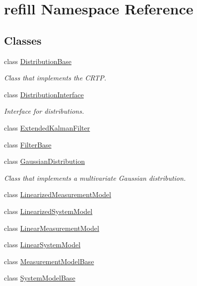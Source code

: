 \hypertarget{namespacerefill}{}\section{refill Namespace Reference}
\label{namespacerefill}
\subsection*{Classes}
\begin{DoxyCompactItemize}
\item 
class \hyperlink{classrefill_1_1DistributionBase}{Distribution\+Base}
\begin{DoxyCompactList}\small\item\em Class that implements the C\+R\+TP. \end{DoxyCompactList}\item 
class \hyperlink{classrefill_1_1DistributionInterface}{Distribution\+Interface}
\begin{DoxyCompactList}\small\item\em Interface for distributions. \end{DoxyCompactList}\item 
class \hyperlink{classrefill_1_1ExtendedKalmanFilter}{Extended\+Kalman\+Filter}
\item 
class \hyperlink{classrefill_1_1FilterBase}{Filter\+Base}
\item 
class \hyperlink{classrefill_1_1GaussianDistribution}{Gaussian\+Distribution}
\begin{DoxyCompactList}\small\item\em Class that implements a multivariate Gaussian distribution. \end{DoxyCompactList}\item 
class \hyperlink{classrefill_1_1LinearizedMeasurementModel}{Linearized\+Measurement\+Model}
\item 
class \hyperlink{classrefill_1_1LinearizedSystemModel}{Linearized\+System\+Model}
\item 
class \hyperlink{classrefill_1_1LinearMeasurementModel}{Linear\+Measurement\+Model}
\item 
class \hyperlink{classrefill_1_1LinearSystemModel}{Linear\+System\+Model}
\item 
class \hyperlink{classrefill_1_1MeasurementModelBase}{Measurement\+Model\+Base}
\item 
class \hyperlink{classrefill_1_1SystemModelBase}{System\+Model\+Base}
\end{DoxyCompactItemize}
